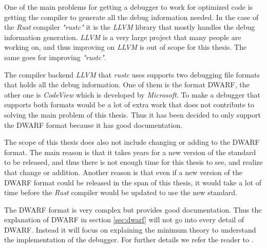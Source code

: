 


One of the main problems for getting a debugger to work for optimized code is getting the compiler to generate all the debug information needed.
In the case of the \emph{Rust} compiler \emph{"rustc"}  it is the \emph{LLVM} library that mostly handles the debug information generation.
\emph{LLVM} is a very large project that many people are working on, and thus improving on \emph{LLVM} is out of scope for this thesis.
The same goes for improving \emph{"rustc"}.


The compiler backend \emph{LLVM} that \emph{rustc} uses supports two debugging file formats that holds all the debug information.
One of them is the format \gls{DWARF}, the other one is \emph{CodeView} which is developed by \emph{Microsoft}.
To make a debugger that supports both formats would be a lot of extra work that does not contribute to solving the main problem of this thesis.
Thus it has been decided to only support the \gls{DWARF} format because it has good documentation.


The scope of this thesis does also not include changing or adding to the \gls{DWARF} format.
The main reason is that it takes years for a new version of the standard to be released, and thus there is not enough time for this thesis to see, and realize that change or addition.
Another reason is that even if a new version of the \gls{DWARF} format could be released in the span of this thesis, it would take a lot of time before the \emph{Rust} compiler would be updated to use the new standard.


The \gls{DWARF} format is very complex but provides good documentation.
Thus the explanation of \gls{DWARF} in section \ref{sec:dwarf} will not go into every detail of \gls{DWARF}.
Instead it will focus on explaining the minimum theory to understand the implementation of the debugger.
For further details we refer the reader to \cite{dwarf}.


